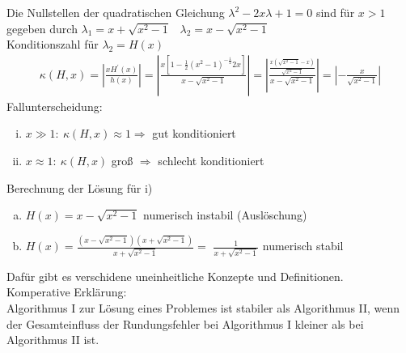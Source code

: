 Die Nullstellen der quadratischen Gleichung $\lambda^2 - 2x\lambda + 1 = 0$ sind
für $x > 1$ gegeben durch $\lambda_1 = x +\sqrt{x^2 - 1} \;\;\; \lambda_2 = x - \sqrt{x^2 - 1}$ \\
Konditionszahl für $\lambda_2 = H(x)$
\begin{align*}
  \kappa(H, x) = |\frac{x H^{\prime}(x)}{h(x)}| = 
  |\frac{x[1 - \frac{1}{2}(x^2 - 1)^{-\frac{1}{2}} 2x]}{x - \sqrt{x^2 - 1}} | =
  |\frac{\frac{x(\sqrt{x^2 - 1} - x)}{\sqrt{x^2 - 1}}}{x - \sqrt{x^2 - 1}}| =
  |- \frac{x}{\sqrt{x^2 - 1}}|
\end{align*}
Fallunterscheidung:
\begin{enumerate}[(i)]
  \item $x \gg 1:\ \kappa(H, x) \approx 1 \Rightarrow$ gut konditioniert
  \item $x \approx 1:\ \kappa(H, x)$ groß $\Rightarrow$ schlecht konditioniert
\end{enumerate}
Berechnung der Lösung für i)
\begin{enumerate}[(a)]
  \item $H(x) = x - \sqrt{x^2 - 1}$ numerisch instabil (Auslöschung)
  \item $H(x) = \frac{(x - \sqrt{x^2 - 1})(x + \sqrt{x^2 - 1})}{x + \sqrt{x^2 - 1}} = $
    $\frac{1}{x + \sqrt{x^2 - 1}}$ numerisch stabil
\end{enumerate}

Dafür gibt es verschidene uneinheitliche Konzepte und Definitionen. \\
Komperative Erklärung: \\
Algorithmus I zur Lösung eines Problemes ist stabiler als Algorithmus II,
wenn der Gesamteinfluss der Rundungsfehler bei Algorithmus I kleiner als
bei Algorithmus II ist.

